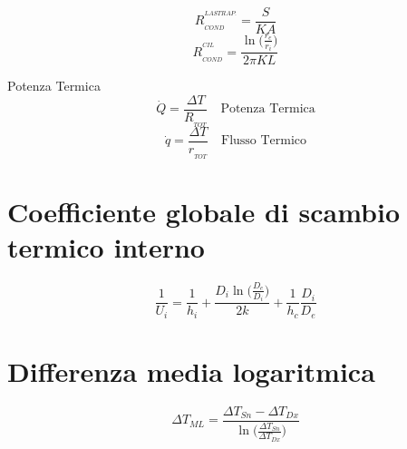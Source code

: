 \documentclass[10pt,portrait,a4paper]{article}
\begin{document}
\begin{multicols}{2}
\[ R_{_{COND}}^{^{LASTRA P.}} =\frac{S}{KA}\]
\[ R_{_{COND}}^{^{CIL}} = \frac {\ln \Big ( \frac {r_{e}}{r_{i}} \Big )} {2 \pi KL} \]


Potenza Termica
\[ \dot{Q} =\frac{\Delta T}{R_{_{TOT}}}  \quad \textrm{Potenza Termica} \]
\[ \dot{q} =\frac{\Delta T}{r_{_{TOT}}}  \quad \textrm{Flusso Termico} \]

\section{Coefficiente globale di scambio termico interno}

\[ \frac {1}{U_{i}} = \frac {1}{h_{i}} + \frac {D_{i} \ln \Big( \frac {D_{e}}{D_{i}} \Big) } {2k} + \frac {1}{h_{c}} \frac {D_{i}}{D_{e}}  \]

\section{Differenza media logaritmica}

\[ \Delta T_{ML} = \frac {\Delta T_{Sn}-\Delta T_{Dx}} { \ln \Big( \frac { \Delta T_{Sn}}{\Delta T_{Dx}} \Big) }   \]



\end{multicols}
\end{document}
